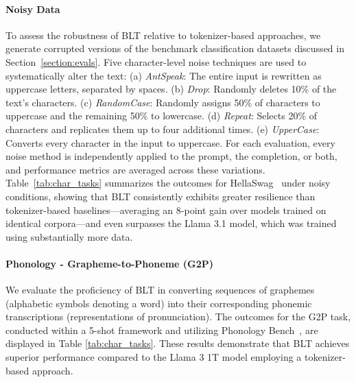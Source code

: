 \paragraph{Noisy Data} To assess the robustness of {\textsc BLT} relative to tokenizer-based approaches, we generate corrupted versions of the benchmark classification datasets discussed in Section~\ref{section:evals}. Five character-level noise techniques are used to systematically alter the text: (a) \textit{AntSpeak}: The entire input is rewritten as uppercase letters, separated by spaces. (b) \textit{Drop}: Randomly deletes 10\% of the text’s characters. (c) \textit{RandomCase}: Randomly assigns 50\% of characters to uppercase and the remaining 50\% to lowercase. (d) \textit{Repeat}: Selects 20\% of characters and replicates them up to four additional times. (e) \textit{UpperCase}: Converts every character in the input to uppercase. For each evaluation, every noise method is independently applied to the prompt, the completion, or both, and performance metrics are averaged across these variations. Table~\ref{tab:char_tasks} summarizes the outcomes for HellaSwag~\citep{Eval_hellaswag} under noisy conditions, showing that {\textsc BLT} consistently exhibits greater resilience than tokenizer-based baselines—averaging an 8-point gain over models trained on identical corpora—and even surpasses the Llama 3.1 model, which was trained using substantially more data.

\paragraph{Phonology - Grapheme-to-Phoneme (G2P)} We evaluate the proficiency of {\textsc BLT} in converting sequences of graphemes (alphabetic symbols denoting a word) into their corresponding phonemic transcriptions (representations of pronunciation). The outcomes for the G2P task, conducted within a 5-shot framework and utilizing Phonology Bench~\citep{suvarna2024phonologybench}, are displayed in Table \ref{tab:char_tasks}. These results demonstrate that {\textsc BLT} achieves superior performance compared to the Llama 3 1T model employing a tokenizer-based approach.


